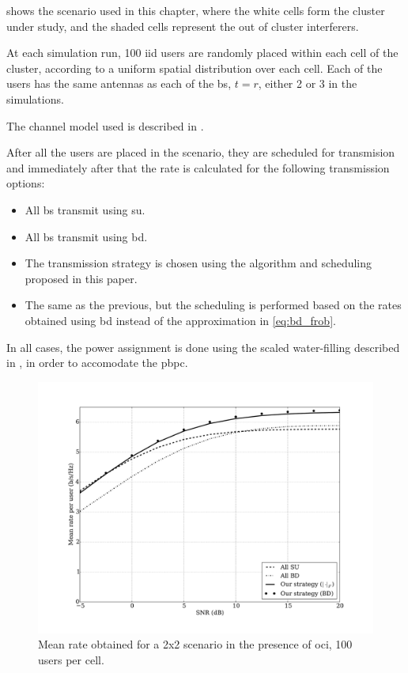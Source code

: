  shows the scenario used in this chapter, where the
white cells form the cluster under study, and the shaded cells represent the out
of cluster interferers.

At each simulation run, 100 \gls{iid} users are randomly placed within each cell
of the cluster, according to a uniform spatial distribution over each cell. Each
of the users has the same antennas as each of the \gls{bs}, \ie $t=r$, either 2
or 3 in the simulations.

The channel model used is described in .

After all the users are placed in the scenario, they are scheduled for
transmision and immediately after that the rate is calculated for the following
transmission options:

\begin{itemize}
    \item All \gls{bs} transmit using \gls{su}.
    \item All \gls{bs} transmit using \gls{bd}.
    \item The transmission strategy is chosen using the algorithm and scheduling
        proposed in this paper.
    \item The same as the previous, but the scheduling is performed based on the
        rates obtained using \gls{bd} instead of the approximation in
        \eqref{eq:bd_frob}.
\end{itemize}

In all cases, the power assignment is done using the scaled water-filling
described in , in order to accomodate the \gls{pbpc}.

\begin{figure}[t]
\centering
\includegraphics[width=0.75\columnwidth]{./12.simple_threshold_scheduling/figure/mean_rate_02x02_100user_bd}
\caption{Mean rate obtained for a 2x2 scenario in the presence of \gls{oci}, 100
users per cell.}
\label{fig:mean_rate_2x2}
\end{figure}

